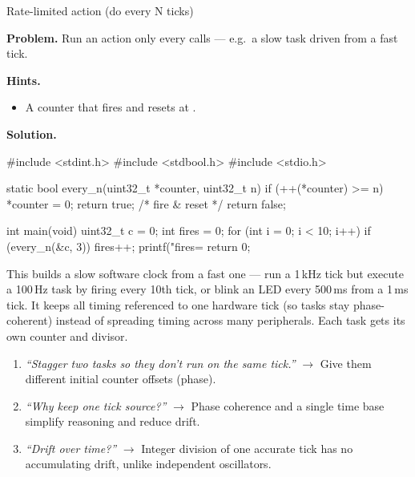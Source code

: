 \begin{gymproblem}{Rate-limited action (do every N ticks)}

\textbf{Problem.} Run an action only every  calls --- e.g.\ a slow task
driven from a fast tick.

\textbf{Hints.}
\begin{itemize}
\item A counter that fires and resets at .
\end{itemize}

\attempt

\textbf{Solution.}
\begin{cgym}
#include <stdint.h>
#include <stdbool.h>
#include <stdio.h>

static bool every_n(uint32_t *counter, uint32_t n) {
    if (++(*counter) >= n) { *counter = 0; return true; }   /* fire & reset */
    return false;
}

int main(void) {
    uint32_t c = 0; int fires = 0;
    for (int i = 0; i < 10; i++) if (every_n(&c, 3)) fires++;
    printf("fires=%
    return 0;
}
\end{cgym}

This builds a slow software clock from a fast one --- run a 1\,kHz tick but
execute a 100\,Hz task by firing every 10th tick, or blink an LED every 500\,ms
from a 1\,ms tick. It keeps all timing referenced to one hardware tick (so tasks
stay phase-coherent) instead of spreading timing across many peripherals. Each
task gets its own counter and divisor.

\followups
\begin{enumerate}
\item \emph{``Stagger two tasks so they don't run on the same tick.''}
  $\rightarrow$ Give them different initial counter offsets (phase).
\item \emph{``Why keep one tick source?''} $\rightarrow$ Phase coherence and a
  single time base simplify reasoning and reduce drift.
\item \emph{``Drift over time?''} $\rightarrow$ Integer division of one accurate
  tick has no accumulating drift, unlike independent oscillators.
\end{enumerate}
\end{gymproblem}

